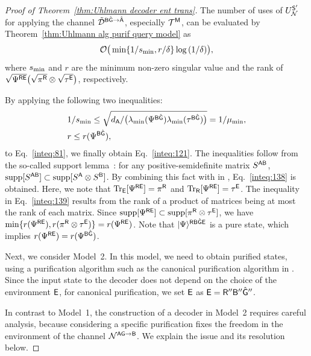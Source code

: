 \begin{proof}[Proof of Theorem~\ref{thm:Uhlmann decoder ent trans}]
The number of uses of $U_{\mathcal{N}}^{{\mathsf{S}}'}$ for applying the channel $\tilde{{\mathcal{D}}}^{{\mathsf{B}}\hat{{\mathsf{G}}}\rightarrow\hat{{\mathsf{A}}}}$, especially ${\mathcal{T}}^{\mathsf{M}}$, can be evaluated by Theorem~\ref{thm:Uhlmann alg purif query model} as
\begin{align}
\label{inteq:81}
    {\mathcal{O}}\big(\min\{{1/s_{\rm min}}, r/\delta\}\log{(1/\delta)}\big), 
\end{align}
where $s_{\rm min}$ and $r$ are the minimum non-zero singular value and the rank of $\sqrt{\Psi^{{\mathsf{R}}{\mathsf{E}}}}\big(\sqrt{\pi^{\mathsf{R}}}\otimes\sqrt{\tau^{\mathsf{E}}}\big)$, respectively.

By applying the following two inequalities:
\begin{align}
    \label{inteq:138}
    &1/s_{\rm min} \leq \sqrt{d_{\mathsf{A}}/\big(\lambda_{\rm min}(\Psi^{{\mathsf{B}}\hat{{\mathsf{G}}}})\lambda_{\rm min}(\tau^{{\mathsf{B}}\hat{{\mathsf{G}}}})\big)} = 1/\mu_{\rm min},  \\
    \label{inteq:139}
    &r \leq r(\Psi^{{\mathsf{B}}\hat{{\mathsf{G}}}}),
\end{align}
to Eq.~\eqref{inteq:81}, we finally obtain Eq.~\eqref{inteq:121}.
The inequalities follow from the so-called support lemma~\cite{Renner05securityQKD, wilde2013QItheory}: for any positive-semidefinite matrix $S^{{\mathsf{A}}{\mathsf{B}}}$, $\mathrm{supp}[S^{{\mathsf{A}}{\mathsf{B}}}] \subset \mathrm{supp}[S^{\mathsf{A}}\otimes S^{\mathsf{B}}]$.
By combining this fact with  in , Eq.~\eqref{inteq:138} is obtained.
Here, we note that $\operatorname{Tr}_{\mathsf{E}}[\Psi^{{\mathsf{R}}{\mathsf{E}}}] = \pi^{\mathsf{R}}$ and $\operatorname{Tr}_{\mathsf{R}}[\Psi^{{\mathsf{R}}{\mathsf{E}}}] = \tau^{\mathsf{E}}$.
The inequality in Eq.~\eqref{inteq:139} results from the rank of a product of matrices being at most the rank of each matrix.
Since $\mathrm{supp}[\Psi^{{\mathsf{R}}{\mathsf{E}}}] \subset \mathrm{supp}[\pi^{\mathsf{R}} \otimes \tau^{\mathsf{E}}]$, we have $\min\{r(\Psi^{{\mathsf{R}}{\mathsf{E}}}), r(\pi^{\mathsf{R}}\otimes \tau^{\mathsf{E}})\} = r(\Psi^{{\mathsf{R}}{\mathsf{E}}})$.
Note that $|\Psi\rangle^{{\mathsf{R}}{\mathsf{B}}\hat{{\mathsf{G}}}{\mathsf{E}}}$ is a pure state, which implies $r(\Psi^{{\mathsf{R}}{\mathsf{E}}}) = r(\Psi^{{\mathsf{B}}\hat{{\mathsf{G}}}})$.







Next, we consider Model~2.
In this model, we need to obtain purified states, using a purification algorithm such as the canonical purification algorithm in .
Since the input state to the decoder does not depend on the choice of the environment ${\mathsf{E}}$, for canonical purification, we set ${\mathsf{E}}$ as ${\mathsf{E}} = {\mathsf{R}}''{\mathsf{B}}''\hat{{\mathsf{G}}}''$.




In contrast to Model~1, the construction of a decoder in Model~2 requires careful analysis, because considering a specific purification fixes the freedom in the environment of the channel ${\mathcal{N}}^{{\mathsf{A}}{\mathsf{G}}\rightarrow{\mathsf{B}}}$.
We explain the issue and its resolution below. 





\end{proof}
